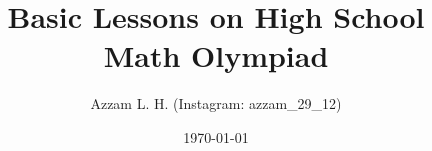 \title{Basic Lessons on High School Math Olympiad}
\date{\today}
\author{Azzam L. H. (Instagram: azzam\_29\_12)}
\maketitle
\renewcommand*\contentsname{Daftar Isi}
\tableofcontents
\newpage
	


